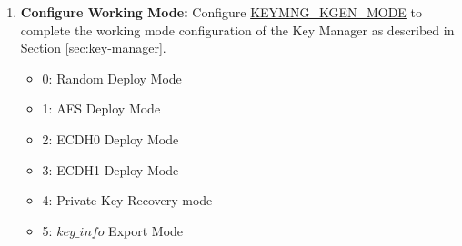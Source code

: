 \documentclass[main\_\_EN.tex]{subfiles}
\begin{document}
\begin{enumerate}
\begin{itemize}
        \begin{itemize}
            \item 0: Use a eFuse block with purpose of EFUSE\_KM\_INIT\_KEY.
            \item 1: Use the software configured \begin{math}sw\_init\_key\end{math}.
        \end{itemize}
    \item \textbf{\hyperref[fielddesc:EFUSEKMRNDSWITCHCYCLE]{EFUSE\_KM\_RND\_SWITCH\_CYCLE}:} Configures the interval for the Key Manager to switch random numbers. It is recommended to set this switch cycle to the number of Key Manager clock cycles corresponding to the TRNG module clock cycles.
        \begin{itemize}
            \item 0: Switch cycle is controlled by \hyperref[fielddesc:KEYMNGRNDSWITCHCYCLE]{KEYMNG\_RND\_SWITCH\_CYCLE}.
            \item 1: 8 cycles of Key Manager clock.
            \item 2: 16 cycles of Key Manager clock.
            \item 3: 32 cycles of Key Manager clock.
        \end{itemize}
        \item \textbf{\hyperref[fielddesc:KEYMNGRNDSWITCHCYCLE]{KEYMNG\_RND\_SWITCH\_CYCLE}:} Configures the interval for the Key Manager to switch random numbers, valid only when \hyperref[fielddesc:EFUSEKMRNDSWITCHCYCLE]{EFUSE\_KM\_RND\_SWITCH\_CYCLE} is 0. It is recommended to set this switch cycle to the number of Key Manager clock cycles corresponding to the TRNG module clock cycles.
    \end{itemize}
    \item \textbf{Configure Working Mode:} Configure \hyperref[fielddesc:KEYMNGKGENMODE]{KEYMNG\_KGEN\_MODE} to complete the working mode configuration of the Key Manager as described in Section \ref{sec:key-manager}.
    \begin{itemize}
        \item 0: Random Deploy Mode
        \item 1: AES Deploy Mode
        \item 2: ECDH0 Deploy Mode
        \item 3: ECDH1 Deploy Mode
        \item 4: Private Key Recovery mode
        \item 5: \hyperref[para:keyinfo]{\begin{math}key\_info\end{math}} Export Mode

\end{itemize}
\end{enumerate}
\end{document}
